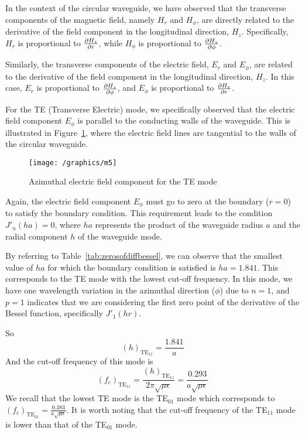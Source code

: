 In the context of the circular waveguide, we have observed that the transverse components of the magnetic field, namely $H_r$ and $H_\phi$, are directly related to the derivative of the field component in the longitudinal direction, $H_z$. Specifically, $H_r$ is proportional to $\partialderivative{H_z}{r}$, while $H_\phi$ is proportional to $\partialderivative{H_z}{\phi}$.

Similarly, the transverse components of the electric field, $E_r$ and $E_\phi$, are related to the derivative of the field component in the longitudinal direction, $H_z$. In this case, $E_r$ is proportional to $\partialderivative{H_z}{\phi}$, and $E_\phi$ is proportional to $\partialderivative{H_z}{r}$.

For the TE (Transverse Electric) mode, we specifically observed that the electric field component $E_\phi$ is parallel to the conducting walls of the waveguide. This is illustrated in Figure~\ref{fig:m5}, where the electric field lines are tangential to the walls of the circular waveguide.
\begin{figure}[h]
\centering
\texttt{[image: /graphics/m5]}
\caption{Azimuthal electric field component for the TE mode}
\label{fig:m5}
\end{figure}

Again, the electric field component $E_\phi$ must go to zero at the boundary ($r=0$) to satisfy the boundary condition. This requirement leads to the condition $J'_n(ha) = 0$, where $ha$ represents the product of the waveguide radius $a$ and the radial component $h$ of the waveguide mode.

By referring to Table~\ref{tab:zerosofdiffbessel}, we can observe that the smallest value of $ha$ for which the boundary condition is satisfied is $ha = 1.841$. This corresponds to the TE mode with the lowest cut-off frequency. In this mode, we have one wavelength variation in the azimuthal direction ($\phi$) due to $n=1$, and $p=1$ indicates that we are considering the first zero point of the derivative of the Bessel function, specifically $J'_1(hr)$.

So
$$
(h)_{\text{TE}_{11}} = \frac{1.841}{a}
$$
And the cut-off frequency of this mode is 
$$
(f_c)_{\text{TE}_{11}} = \frac{(h)_{\text{TE}_{11}}}{2\pi\sqrt{\mu\epsilon}} = \frac{0.293}{a\sqrt{\mu\epsilon}}
$$
We recall that the lowest TE mode is the TE$_{01}$ mode which corresponds to $(f_c)_{\text{TE}_{01}} = \frac{0.383}{a\sqrt{\mu\epsilon}}$. It is worth noting that the cut-off frequency of the TE$_{11}$ mode is lower than that of the TE$_{01}$ mode.

